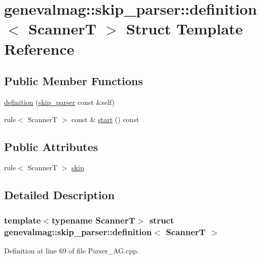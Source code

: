 \hypertarget{structgenevalmag_1_1skip__parser_1_1definition}{
\section{genevalmag::skip\_\-parser::definition$<$ ScannerT $>$ Struct Template Reference}
\label{structgenevalmag_1_1skip__parser_1_1definition}
}
\subsection*{Public Member Functions}
\begin{DoxyCompactItemize}
\item 
\hyperlink{structgenevalmag_1_1skip__parser_1_1definition_a07635eafec4514b1414d278690927029}{definition} (\hyperlink{structgenevalmag_1_1skip__parser}{skip\_\-parser} const \&self)
\item 
rule$<$ ScannerT $>$ const \& \hyperlink{structgenevalmag_1_1skip__parser_1_1definition_aa0b33d5c074089c9c6b2b32f7b231ec8}{start} () const 
\end{DoxyCompactItemize}
\subsection*{Public Attributes}
\begin{DoxyCompactItemize}
\item 
rule$<$ ScannerT $>$ \hyperlink{structgenevalmag_1_1skip__parser_1_1definition_a2398e67792c6720473244c0c6c9a0d93}{skip}
\end{DoxyCompactItemize}


\subsection{Detailed Description}
\subsubsection*{template$<$typename ScannerT$>$ struct genevalmag::skip\_\-parser::definition$<$ ScannerT $>$}



Definition at line 69 of file Parser\_\-AG.cpp.



